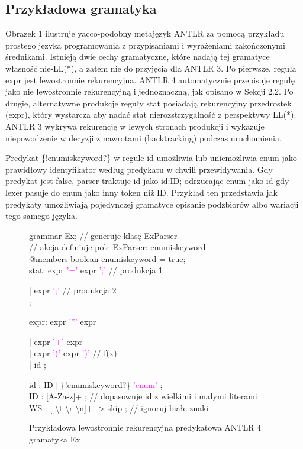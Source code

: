 \subsection{Przykładowa gramatyka}
Obrazek 1 ilustruje yacco-podobny metajęzyk ANTLR za pomocą przykładu prostego języka
programowania z przypisaniami i wyrażeniami zakończonymi średnikami. 
Istnieją dwie cechy gramatyczne, które nadają tej gramatyce własność nie-LL(*),
a zatem nie do przyjęcia dla ANTLR 3.
Po pierwsze, reguła expr jest lewostronnie rekurencyjna.
ANTLR 4 automatycznie przepisuje regułę jako nie lewostronnie rekurencyjną i jednoznaczną,
jak opisano w Sekcji 2.2. Po drugie, alternatywne produkcje reguły stat posiadają
rekurencyjny przedrostek (expr), który wystarcza aby nadać stat nierozstrzygalność
z perspektywy LL(*). ANTLR 3 wykrywa rekurencję w lewych stronach produkcji i
wykazuje niepowodzenie w decyzji z nawrotami (backtracking) podczas uruchomienia.
\par
Predykat \{!enum\textunderscore is\textunderscore keyword?\} w regule id
umożliwia lub uniemożliwia enum jako prawidłowy identyfikator według predykatu
w chwili przewidywania. Gdy predykat jest false, parser traktuje id jako
id:ID; odrzucając enum jako id gdy lexer pasuje do enum jako inny token niż 
ID. Przykład ten przedstawia jak predykaty umożliwiają pojedynczej
gramatyce opisanie podzbiorów albo wariacji tego samego języka. 
\begin{figure}[!ht]
grammar Ex; \textcolor{PineGreen}{// generuje klasę ExParser} \\
\textcolor{PineGreen}{// akcja definiuje pole ExParser: enum\textunderscore is\textunderscore keyword} \\
@members { boolean enum\textunderscore is\textunderscore keyword = true;} \\
stat: expr \textcolor{magenta}{'='} expr \textcolor{magenta}{';'} \textcolor{PineGreen}{// produkcja 1}
\begin{adjustwidth}{1cm}{}
  | expr \textcolor{magenta}{';'} \textcolor{PineGreen}{// produkcja 2} \\
  ; 
\end{adjustwidth}
expr: expr \textcolor{magenta}{'*'} expr
\begin{adjustwidth}{1cm}{}
    | expr \textcolor{magenta}{'+'} expr \\
    | expr \textcolor{magenta}{'('} expr \textcolor{magenta}{')'} \textcolor{PineGreen}{// f(x)} \\
    | id 
    ; \\
\end{adjustwidth}    
id : ID | \{!enum\textunderscore is\textunderscore keyword?\} \textcolor{magenta}{'enum'} ; \\
ID : [A-Za-z]+ ; \textcolor{PineGreen}{// dopasowuje id z wielkimi i małymi literami} \\
WS : [ \textbackslash t \textbackslash r \textbackslash n]+ -> skip ; \textcolor{PineGreen}{// ignoruj białe znaki} \\
\caption{Przykładowa lewostronnie rekurencyjna predykatowa ANTLR 4 gramatyka Ex}
\end{figure}
